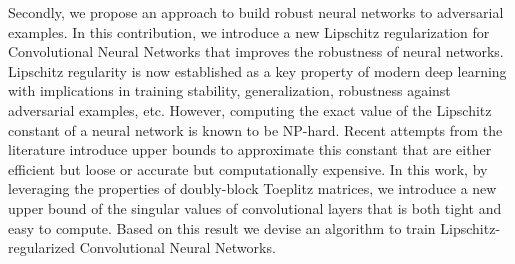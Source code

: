Secondly, we propose an approach to build robust neural networks to adversarial examples.
In this contribution, we introduce a new Lipschitz regularization for Convolutional Neural Networks that improves the robustness of neural networks.
Lipschitz regularity is now established as a key property of modern deep learning with implications in training stability, generalization, robustness against adversarial examples, etc.
However, computing the exact value of the Lipschitz constant of a neural network is known to be NP-hard.
Recent attempts from the literature introduce upper bounds to approximate this constant that are either efficient but loose or accurate but computationally expensive.
In this work, by leveraging the properties of doubly-block Toeplitz matrices, we introduce a new upper bound of the singular values of convolutional layers that is both tight and easy to compute.
Based on this result we devise an algorithm to train Lipschitz-regularized Convolutional Neural Networks.



\newpage
\null
\thispagestyle{empty}
\newpage
